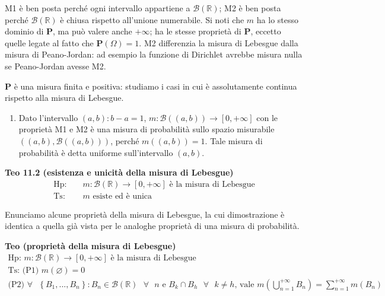 \documentclass{article}
\begin{document}
M1 \`{e} ben posta perch\'{e} ogni intervallo appartiene a $\mathcal{B}%
\left( 
\mathbb{R}
\right) $; M2 \`{e} ben posta perch\'{e} $\mathcal{B}\left( 
\mathbb{R}
\right) $ \`{e} chiusa rispetto all'unione numerabile. Si noti che $m$ ha lo
stesso dominio di $\mathbf{P}$, ma pu\`{o} valere anche $+\infty $; ha le
stesse propriet\`{a} di $\mathbf{P}$, eccetto quelle legate al fatto che $%
\mathbf{P}\left( \Omega \right) =1$. M2 differenzia la misura di Lebesgue
dalla misura di Peano-Jordan: ad esempio la funzione di Dirichlet avrebbe
misura nulla se Peano-Jordan avesse M2.

$\mathbf{P}$ \`{e} una misura finita e positiva: studiamo i casi in cui \`{e}
assolutamente continua rispetto alla misura di Lebesgue.

\begin{enumerate}
\item Dato l'intervallo $\left( a,b\right) :b-a=1$, $m:\mathcal{B}\left(
\left( a,b\right) \right) \rightarrow \left[ 0,+\infty \right] $ con le
propriet\`{a} M1 e M2 \`{e} una misura di probabilit\`{a} sullo spazio
misurabile $\left( \left( a,b\right) ,\mathcal{B}\left( \left( a,b\right)
\right) \right) $, perch\'{e} $m\left( \left( a,b\right) \right) =1$. Tale
misura di probabilit\`{a} \`{e} detta uniforme sull'intervallo $\left(
a,b\right) $.
\end{enumerate}

\textbf{Teo 11.2 (esistenza e unicit\`{a} della misura di Lebesgue)}%
\begin{eqnarray*}
\text{Hp}\text{: } &&m:\mathcal{B}\left( 
\mathbb{R}
\right) \rightarrow \left[ 0,+\infty \right] \text{ \`{e} la misura di
Lebesgue} \\
\text{Ts}\text{: } &&m\text{ esiste ed \`{e} unica}
\end{eqnarray*}

Enunciamo alcune proprietà della misura di Lebesgue, la cui dimostrazione è identica a quella già vista per le analoghe proprietà di una misura di probabilità.

\textbf{Teo (propriet\`{a} della misura di Lebesgue)}%
\begin{gather*}
\text{Hp: }m:\mathcal{B}\left( 
\mathbb{R}
\right) \rightarrow \left[ 0,+\infty \right] \text{ \`{e} la misura di
Lebesgue} \\
\text{Ts: (P1) }m\left( \varnothing \right) =0 \\
\text{(P2) }\forall \text{ }\left\{ B_{1},...,B_{n}\right\} :B_{n}\in 
\mathcal{B}\left( 
\mathbb{R}
\right) \text{ }\forall \text{ }n\text{ e }B_{k}\cap B_{h}\text{ }\forall 
\text{ }k\neq h\text{, vale }m\left( \bigcup_{n=1}^{+\infty }B_{n}\right)
=\sum_{n=1}^{+\infty }m\left( B_{n}\right)
\end{gather*}
\end{document}
